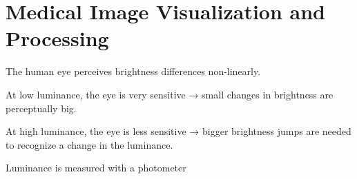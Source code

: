 \part{Medical Image Visualization and Processing}

The human eye perceives brightness differences non-linearly.

At low luminance, the eye is very sensitive → small changes in brightness are perceptually big.

At high luminance, the eye is less sensitive → bigger brightness jumps are needed to recognize a change in the luminance.

Luminance is measured with a photometer